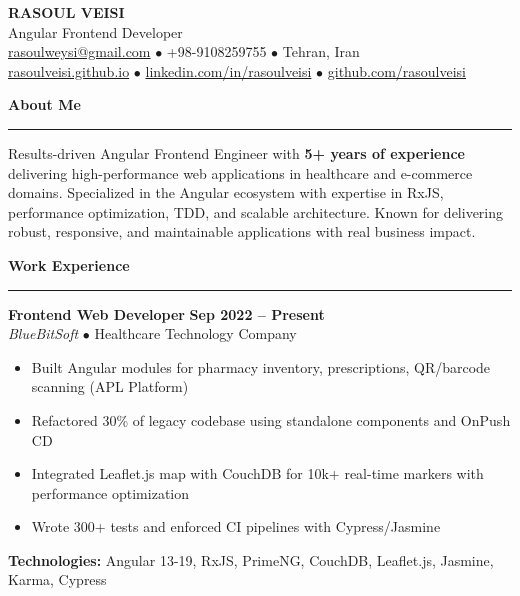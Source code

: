 \documentclass[a4paper,10pt]{article}
\newcommand{\sectionheader}[1]{\vspace{4pt}\textbf{\large\color{headercolor}#1}\vspace{1pt}\hrule\vspace{2pt}}
\newcommand{\jobtitle}[1]{\textbf{#1}}
\newcommand{\company}[1]{\textit{\color{headercolor}#1}}
\begin{document}
\begin{center}
    {\huge\bfseries\color{headercolor} RASOUL VEISI} \\
    \vspace{1pt}
    {\large Angular Frontend Developer} \\
    \vspace{2pt}
    \href{mailto:rasoulweysi@gmail.com}{rasoulweysi@gmail.com} $\bullet$ +98-9108259755 $\bullet$ Tehran, Iran \\
    \href{https://rasoulveisi.github.io}{rasoulveisi.github.io} $\bullet$ \href{http://linkedin.com/in/rasoulveisi}{linkedin.com/in/rasoulveisi} $\bullet$ \href{https://github.com/rasoulveisi}{github.com/rasoulveisi}
\end{center}

\sectionheader{About Me}
Results-driven Angular Frontend Engineer with \textbf{5+ years of experience} delivering high-performance web applications in healthcare and e-commerce domains. Specialized in the Angular ecosystem with expertise in RxJS, performance optimization, TDD, and scalable architecture. Known for delivering robust, responsive, and maintainable applications with real business impact.

\sectionheader{Work Experience}

\jobtitle{Frontend Web Developer} \hfill \textbf{Sep 2022 -- Present} \\
\company{BlueBitSoft} $\bullet$ Healthcare Technology Company \\
\vspace{-3pt}
\begin{itemize}[leftmargin=15pt, itemsep=0.5pt, parsep=0pt, topsep=2pt]
    \item Built Angular modules for pharmacy inventory, prescriptions, QR/barcode scanning (APL Platform)
    \item Refactored 30\% of legacy codebase using standalone components and OnPush CD
    \item Integrated Leaflet.js map with CouchDB for 10k+ real-time markers with performance optimization
    \item Wrote 300+ tests and enforced CI pipelines with Cypress/Jasmine
\end{itemize}
\vspace{1pt}
\textbf{Technologies:} Angular 13-19, RxJS, PrimeNG, CouchDB, Leaflet.js, Jasmine, Karma, Cypress
\end{document}

